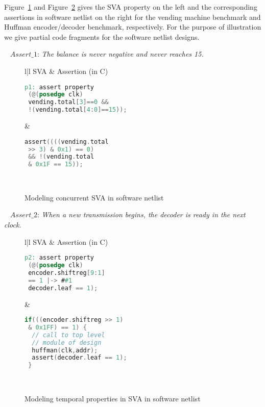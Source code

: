 Figure~\ref{figure:prop1} and Figure~\ref{figure:prop2} gives 
the SVA property on the left and the corresponding assertions 
in software netlist on the right for the vending machine benchmark 
and Huffman encoder/decoder benchmark, respectively. For the purpose 
of illustration we give partial code fragments for the software 
netlist designs.
%
\begin{example}~\label{safety-prop}
$Assert\_1$: {\em The balance is never negative and never reaches 15.} 
\begin{figure}[htbp]
\centering
\scriptsize
\begin{tabular}{l|l}
\hline
SVA & Assertion (in C)
\\
\hline
\begin{lstlisting}[mathescape=true,language=Verilog]
p1: assert property 
 (@(posedge clk) 
 vending.total[3]==0 && 
 !(vending.total[4:0]==15)); 
\end{lstlisting}
&
\begin{lstlisting}[mathescape=true,language=C]
 assert((((vending.total 
 >> 3) & 0x1) == 0) 
 && !(vending.total 
 & 0x1F == 15));
\end{lstlisting} \\
\hline
\end{tabular}
\caption{Modeling concurrent SVA in software netlist}
\label{figure:prop1}
\end{figure}
%
\end{example}
%
\begin{example}~\label{safety-propnew}
$Assert\_2$: {\em When a new transmission begins, the decoder is ready in the next clock.}
%
\begin{figure}[htbp]
\centering
\scriptsize
\begin{tabular}{l|l}
\hline
SVA & Assertion (in C)
\\
\hline
\begin{lstlisting}[mathescape=true,language=Verilog]
p2: assert property 
 (@(posedge clk) 
 encoder.shiftreg[9:1] 
 == 1 |-> ##1 
 decoder.leaf == 1);
\end{lstlisting}
&
\begin{lstlisting}[mathescape=true,language=C]
 if(((encoder.shiftreg >> 1) 
 & 0x1FF) == 1) {
  // call to top level 
  // module of design
  huffman(clk,addr);  
  assert(decoder.leaf == 1);
 }
\end{lstlisting} \\
\hline
\end{tabular}
\caption{Modeling temporal properties in SVA in software netlist}
\label{figure:prop2}
\end{figure}
\end{example}

